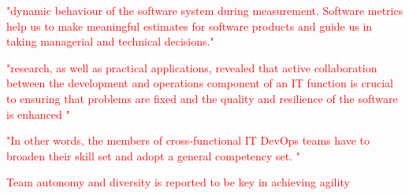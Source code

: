 \textcolor{red}{"dynamic behaviour of the software system during measurement. Software metrics help us to make meaningful estimates for software products and guide us in taking managerial and technical decisions." \cite{jkc_2010}}

\textcolor{red}{"research, as well as practical applications, revealed that active collaboration between the development and operations component of an IT function is crucial to ensuring that problems are fixed and the quality and resilience of the software is enhanced \cite{aw_2019}"}

\textcolor{red}{"In other words, the members of cross-functional IT DevOps teams have to broaden their skill set and adopt a general competency set. \cite{aw_2019}"}

\textcolor{red}{Team autonomy and diversity is reported to be key in achieving agility \cite{gl_2010}}







